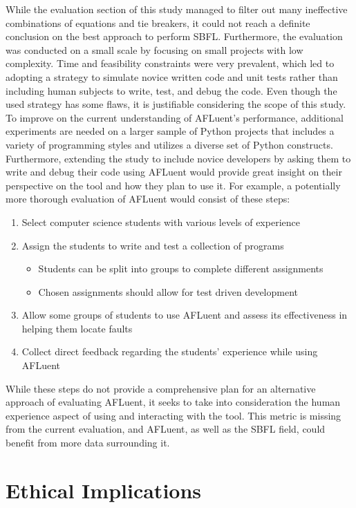 While the evaluation section of this study managed to filter out many
ineffective combinations of equations and tie breakers, it could not reach a
definite conclusion on the best approach to perform SBFL. Furthermore, the
evaluation was conducted on a small scale by focusing on small projects with low
complexity. Time and feasibility constraints were very prevalent, which led to
adopting a strategy to simulate novice written code and unit tests rather than
including human subjects to write, test, and debug the code. Even though
the used strategy has some flaws, it is justifiable considering the scope of this
study. To improve on
the current understanding of AFLuent's performance,
additional experiments are needed on a larger sample of Python projects that
includes a variety of programming styles and utilizes a diverse set of Python
constructs. Furthermore, extending the
study to include novice developers by asking them to write and debug their code
using AFLuent would provide great insight on their perspective on the tool
and how they plan to use it. For example, a potentially more thorough evaluation of AFLuent
would consist of these steps:
\begin{enumerate}
    \item Select computer science students with various levels of experience
    \item Assign the students to write and test a collection of programs
    \begin{itemize}
        \item Students can be split into groups to complete different assignments
        \item Chosen assignments should allow for test driven development
    \end{itemize}
    \item Allow some groups of students to use AFLuent and assess its
    effectiveness in helping them locate faults
    \item Collect direct feedback regarding the students' experience while using AFLuent
\end{enumerate}
While these steps do not provide a comprehensive plan for an alternative
approach of evaluating AFLuent, it seeks to take into consideration the human
experience aspect of using and interacting with the tool. This metric is missing
from the current evaluation, and AFLuent, as well as the SBFL field, could
benefit from more data surrounding it.

\section{Ethical Implications}

